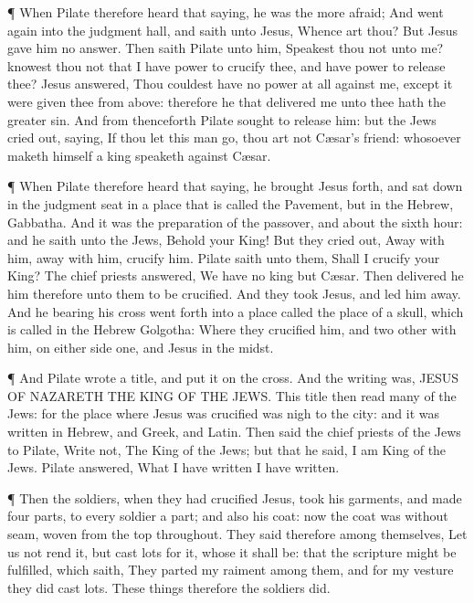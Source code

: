  ¶ When Pilate therefore heard that saying, he was the more
afraid;  And went again into the judgment hall, and saith
unto Jesus, Whence art thou? But Jesus gave him no answer. 
Then saith Pilate unto him, Speakest thou not unto me? knowest thou not
that I have power to crucify thee, and have power to release thee?
 Jesus answered, Thou couldest have no power at all against
me, except it were given thee from above: therefore he that delivered me
unto thee hath the greater sin.  And from thenceforth
Pilate sought to release him: but the Jews cried out, saying, If thou
let this man go, thou art not Cæsar's friend: whosoever maketh himself a
king speaketh against Cæsar.

 ¶ When Pilate therefore heard that saying, he brought
Jesus forth, and sat down in the judgment seat in a place that is called
the Pavement, but in the Hebrew, Gabbatha.  And it was the
preparation of the passover, and about the sixth hour: and he saith unto
the Jews, Behold your King!  But they cried out, Away with
him, away with him, crucify him. Pilate saith unto them, Shall I crucify
your King? The chief priests answered, We have no king but Cæsar.
 Then delivered he him therefore unto them to be crucified.
And they took Jesus, and led him away.  And he bearing his
cross went forth into a place called the place of a skull, which is
called in the Hebrew Golgotha:  Where they crucified him,
and two other with him, on either side one, and Jesus in the midst.

 ¶ And Pilate wrote a title, and put it on the cross. And
the writing was, JESUS OF NAZARETH THE KING OF THE JEWS. 
This title then read many of the Jews: for the place where Jesus was
crucified was nigh to the city: and it was written in Hebrew, and Greek,
and Latin.  Then said the chief priests of the Jews to
Pilate, Write not, The King of the Jews; but that he said, I am King of
the Jews.  Pilate answered, What I have written I have
written.

 ¶ Then the soldiers, when they had crucified Jesus, took
his garments, and made four parts, to every soldier a part; and also his
coat: now the coat was without seam, woven from the top throughout.
 They said therefore among themselves, Let us not rend it,
but cast lots for it, whose it shall be: that the scripture might be
fulfilled, which saith, They parted my raiment among them, and for my
vesture they did cast lots. These things therefore the soldiers did.

